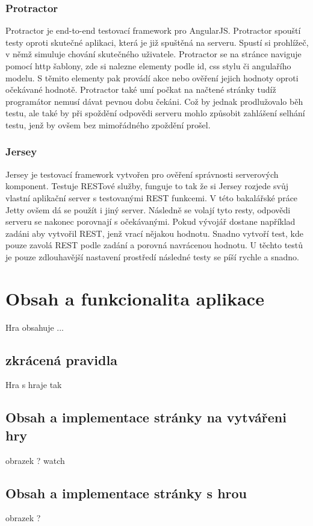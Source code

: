 \documentclass[czech,master,public,dept460,male,cpdeclaration,twoside]{diploma}
\begin{document}
\subsubsection{Protractor}
Protractor je end-to-end testovací framework pro AngularJS. Protractor spouští testy oproti skutečné aplikaci, která je již spuštěná na serveru. Spustí si prohlížeč, v němž simuluje chování skutečného uživatele. Protractor se na stránce naviguje pomocí http šablony, zde si nalezne elementy podle id, css stylu či angulařího modelu. S těmito elementy pak provádí akce nebo ověření jejich hodnoty oproti očekávané hodnotě. Protractor také umí počkat na načtené stránky tudíž programátor nemusí dávat pevnou dobu čekáni. Což by jednak prodlužovalo běh testu, ale také by při spoždění odpovědi serveru mohlo způsobit zahlášení selhání testu, jenž by ovšem bez mimořádného zpoždění prošel. \cite{TestingAngularApp}

\subsubsection{Jersey}
Jersey je testovací framework vytvořen pro ověření správnosti serverových komponent. Testuje RESTové služby, funguje to tak že si Jersey rozjede svůj vlastní aplikační server s testovanými REST funkcemi. V této bakalářské práce Jetty ovšem dá se použít i jiný server. Následně se volají tyto resty, odpovědi serveru se nakonec porovnají s očekávanými. Pokud vývojář dostane například zadáni aby vytvořil REST, jenž vrací nějakou hodnotu. Snadno vytvoří test, kde pouze zavolá REST podle zadání a porovná navrácenou hodnotu. U těchto testů je pouze zdlouhavější nastavení prostředí následné testy se píší rychle a snadno.


\section{Obsah a funkcionalita aplikace}
Hra obsahuje  ...

\subsection{zkrácená pravidla}
Hra s hraje tak

\subsection{Obsah a implementace stránky na vytvářeni hry}
obrazek ? watch


\subsection{Obsah a implementace stránky s hrou}
obrazek ?
\end{document}
